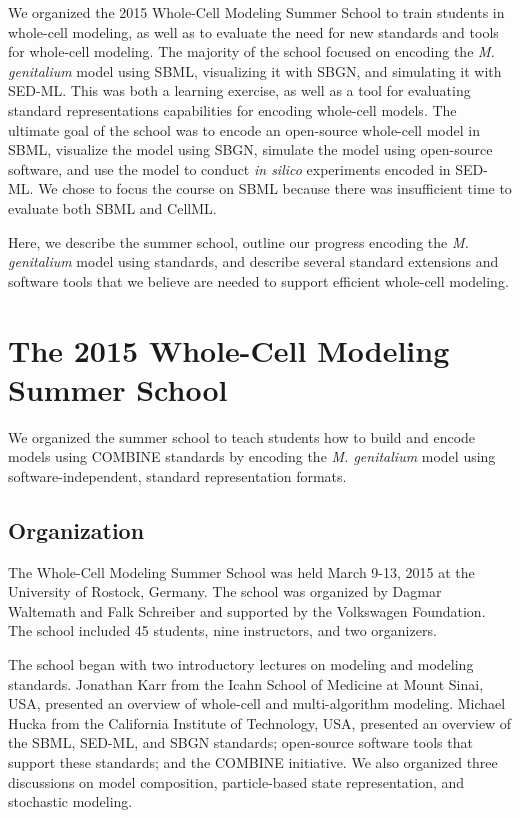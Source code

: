 \documentclass[journal,transmag]{IEEEtran}
\begin{document}
We organized the 2015 Whole-Cell Modeling Summer School to train students in whole-cell modeling, as well as to evaluate the need for new standards and tools for whole-cell modeling. The majority of the school focused on encoding the \textit{M. genitalium} model using SBML, visualizing it with SBGN, and simulating it with SED-ML. This was both a learning exercise, as well as a tool for evaluating standard representations capabilities for encoding whole-cell models. The ultimate goal of the school was to encode an open-source whole-cell model in SBML, visualize the model using SBGN, simulate the model using open-source software, and use the model to conduct \textit{in silico} experiments encoded in SED-ML. We chose to focus the course on SBML because there was insufficient time to evaluate both SBML and CellML.

Here, we describe the summer school, outline our progress encoding the \textit{M. genitalium} model using standards, and describe several standard extensions and software tools that we believe are needed to support efficient whole-cell modeling.

\section{The 2015 Whole-Cell Modeling Summer School}
We organized the summer school to teach students how to build and encode models using COMBINE standards by encoding the \textit{M. genitalium} model using software-independent, standard representation formats.

\subsection{Organization}
The Whole-Cell Modeling Summer School was held March 9-13, 2015 at the University of Rostock, Germany. The school was organized by Dagmar Waltemath and Falk Schreiber and supported by the Volkswagen Foundation. The school included 45 students, nine instructors, and two organizers.

The school began with two introductory lectures on modeling and modeling standards. Jonathan Karr from the Icahn School of Medicine at Mount Sinai, USA, presented an overview of whole-cell and multi-algorithm modeling. Michael Hucka from the California Institute of Technology, USA, presented an overview of the SBML, SED-ML, and SBGN standards; open-source software tools that support these standards; and the COMBINE initiative. We also organized three discussions on model composition, particle-based state representation, and stochastic modeling. 
\end{document}
